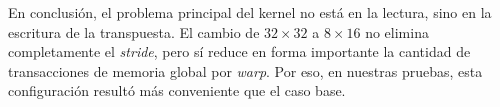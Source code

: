 \documentclass[10pt,a4paper]{article}
\begin{document}
En conclusión, el problema principal del kernel no está en la lectura, sino en la escritura de la transpuesta. El cambio de $32\times 32$ a $8\times 16$ no elimina completamente el \emph{stride}, pero sí reduce en forma importante la cantidad de transacciones de memoria global por \emph{warp}. Por eso, en nuestras pruebas, esta configuración resultó más conveniente que el caso base.
\end{document}
